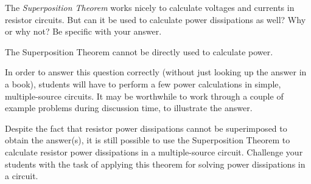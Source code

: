 

The {\it Superposition Theorem} works nicely to calculate voltages and currents in resistor circuits.  But can it be used to calculate power dissipations as well?  Why or why not?  Be specific with your answer.







The Superposition Theorem cannot be directly used to calculate power.







In order to answer this question correctly (without just looking up the answer in a book), students will have to perform a few power calculations in simple, multiple-source circuits.  It may be worthwhile to work through a couple of example problems during discussion time, to illustrate the answer.

Despite the fact that resistor power dissipations cannot be superimposed to obtain the answer(s), it is still possible to use the Superposition Theorem to calculate resistor power dissipations in a multiple-source circuit.  Challenge your students with the task of applying this theorem for solving power dissipations in a circuit.




